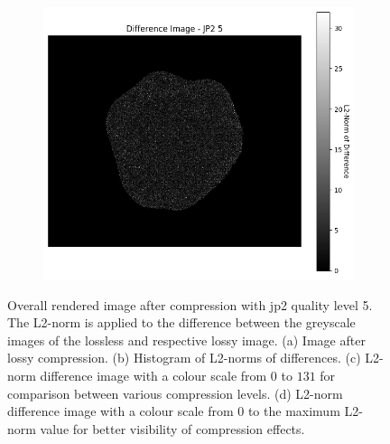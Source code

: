 \begin{figure}[htb]
\begin{subfigure}[b]{0.48\textwidth}
    \end{subfigure}
    \begin{subfigure}[b]{0.48\textwidth}
        \centering
        \includegraphics[width=\textwidth]{doc/thesis/0_figures/compare_quality/set1/jp2_5_diff_heatmap_rel.png}
        \caption{}
        \label{fig:img_quality_comp_jp2_5_diff_rel}
    \end{subfigure}
    \caption{Overall rendered image after compression with \gls{jp2} quality level 5. The L2-norm is applied to the difference between the greyscale images of the lossless and respective lossy image. (a) Image after lossy compression. (b) Histogram of L2-norms of differences. (c) L2-norm difference image with a colour scale from $0$ to $131$ for comparison between various compression levels. (d) L2-norm difference image with a colour scale from $0$ to the maximum L2-norm value for better visibility of compression effects.}
    \label{fig:img_quality_comp_jp2_5}
\end{figure}


